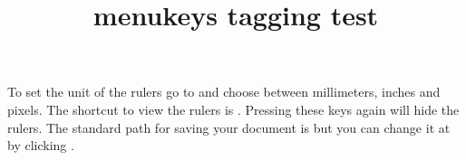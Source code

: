 \documentclass{article}
\title{menukeys tagging test}
\begin{document}
To set the unit of the rulers go to 
and choose between millimeters, inches and pixels. The shortcut
to view the rulers is . Pressing these keys again
will hide the rulers.
The standard path for saving your document is  but you can change it at  by clicking .
\end{document}
